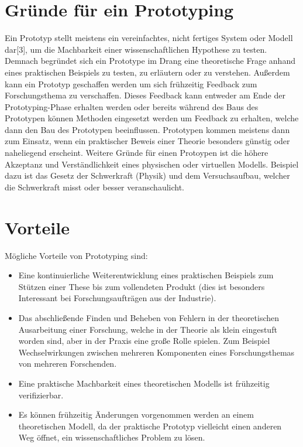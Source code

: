 \documentclass[a0,portrait]{a0poster}
\begin{document}
\begin{multicols}{2}
\color{Black} %

\section*{Gründe für ein Prototyping}
Ein Prototyp stellt meistens ein vereinfachtes, nicht fertiges System oder Modell dar[3], um die Machbarkeit einer wissenschaftlichen Hypothese zu testen. Demnach begründet sich ein Prototype im Drang eine theoretische Frage anhand eines praktischen Beispiels zu testen, zu erläutern oder zu verstehen. Außerdem kann ein Prototyp geschaffen werden um sich frühzeitig Feedback zum Forschungsthema zu verschaffen. Dieses Feedback kann entweder am Ende der Prototyping-Phase erhalten werden oder bereits während des Baus des Prototypen können Methoden eingesetzt werden um Feedback zu erhalten, welche dann den Bau des Prototypen beeinflussen. Prototypen kommen meistens dann zum Einsatz, wenn ein praktischer Beweis einer Theorie besonders günstig oder naheliegend erscheint. Weitere Gründe für einen Protoypen ist die höhere Akzeptanz und Verständlichkeit eines physischen oder virtuellen Modells. Beispiel dazu ist das Gesetz der Schwerkraft (Physik) und dem Versuchsaufbau, welcher die Schwerkraft misst oder besser veranschaulicht.



\section*{Vorteile}
Mögliche Vorteile von Prototyping sind:
\begin{itemize}
    \item Eine kontinuierliche Weiterentwicklung eines praktischen Beispiels zum Stützen einer These bis zum vollendeten Produkt (dies ist besonders Interessant bei Forschungsaufträgen aus der Industrie).
    \item Das abschließende Finden und Beheben von Fehlern in der theoretischen Ausarbeitung einer Forschung, welche in der Theorie als klein eingestuft worden sind, aber in der Praxis eine große Rolle spielen. Zum Beispiel Wechselwirkungen zwischen mehreren Komponenten eines Forschungsthemas von mehreren Forschenden.
    \item Eine praktische Machbarkeit eines theoretischen Modells ist frühzeitig verifizierbar.
    \item Es können frühzeitig Änderungen vorgenommen werden an einem theoretischen Modell, da der praktische Prototyp vielleicht einen anderen Weg öffnet, ein wissenschaftliches Problem zu lösen.
\end{itemize}


\end{multicols}
\end{document}
